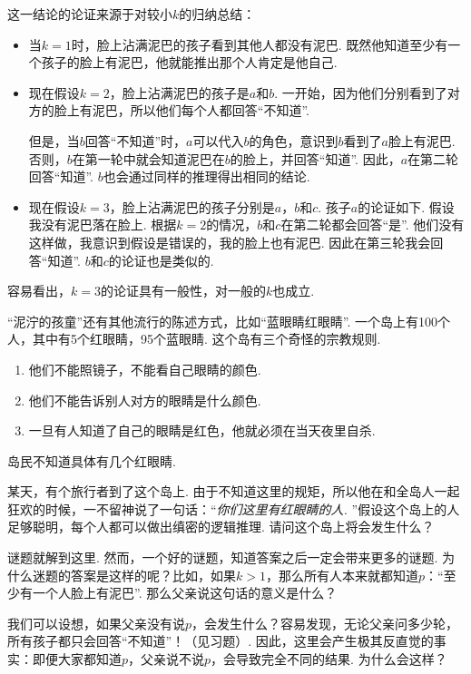 这一结论的论证来源于对较小$k$的归纳总结：
\begin{itemize}
    \item 当$k=1$时，脸上沾满泥巴的孩子看到其他人都没有泥巴. 既然他知道至少有一个孩子的脸上有泥巴，他就能推出那个人肯定是他自己. 
    \item 现在假设$k=2$，脸上沾满泥巴的孩子是$a$和$b$. 一开始，因为他们分别看到了对方的脸上有泥巴，所以他们每个人都回答“不知道”. 
    
    但是，当$b$回答“不知道”时，$a$可以代入$b$的角色，意识到$b$看到了$a$脸上有泥巴. 否则，$b$在第一轮中就会知道泥巴在$b$的脸上，并回答“知道”. 因此，$a$在第二轮回答“知道”. $b$也会通过同样的推理得出相同的结论. 

    \item 现在假设$k=3$，脸上沾满泥巴的孩子分别是$a$，$b$和$c$. 孩子$a$的论证如下. 假设我没有泥巴落在脸上. 根据$k=2$的情况，$b$和$c$在第二轮都会回答“是”. 他们没有这样做，我意识到假设是错误的，我的脸上也有泥巴. 因此在第三轮我会回答“知道”. $b$和$c$的论证也是类似的.
\end{itemize}
容易看出，$k=3$的论证具有一般性，对一般的$k$也成立.

\begin{remark}
“泥泞的孩童”还有其他流行的陈述方式，比如“蓝眼睛红眼睛”. 一个岛上有100个人，其中有5个红眼睛，95个蓝眼睛. 这个岛有三个奇怪的宗教规则.
    \begin{enumerate}
        \item 他们不能照镜子，不能看自己眼睛的颜色. 
        \item 他们不能告诉别人对方的眼睛是什么颜色. 
        \item 一旦有人知道了自己的眼睛是红色，他就必须在当天夜里自杀.
    \end{enumerate}
岛民不知道具体有几个红眼睛. 

某天，有个旅行者到了这个岛上. 由于不知道这里的规矩，所以他在和全岛人一起狂欢的时候，一不留神说了一句话：“\textit{你们这里有红眼睛的人. }”假设这个岛上的人足够聪明，每个人都可以做出缜密的逻辑推理. 请问这个岛上将会发生什么？
\end{remark}

谜题就解到这里. 然而，一个好的谜题，知道答案之后一定会带来更多的谜题. 为什么迷题的答案是这样的呢？比如，如果$k>1$，那么所有人本来就都知道$p$：“至少有一个人脸上有泥巴”. 那么父亲说这句话的意义是什么？

我们可以设想，如果父亲没有说$p$，会发生什么？容易发现，无论父亲问多少轮，所有孩子都只会回答“不知道”！（见习题）. 因此，这里会产生极其反直觉的事实：即便大家都知道$p$，父亲说不说$p$，会导致完全不同的结果. 为什么会这样？

